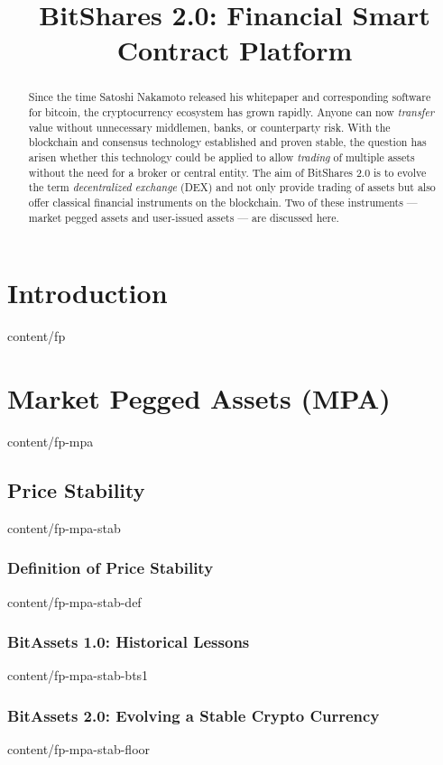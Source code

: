 \documentclass{btswhitepaper}
\title{BitShares 2.0: Financial Smart Contract Platform}
\begin{document}
\sloppy
\maketitle

\begin{abstract}%
 Since the time Satoshi Nakamoto released his whitepaper and corresponding
 software for bitcoin, the cryptocurrency ecosystem has grown rapidly. Anyone
 can now \emph{transfer} value without unnecessary middlemen, banks, or
 counterparty risk. With the blockchain and consensus technology established
 and proven stable, the question has arisen whether this technology could be
 applied to allow \emph{trading} of multiple assets without the need for a
 broker or central entity. The aim of BitShares 2.0 is to evolve the term
 \emph{decentralized exchange} (DEX) and not only provide trading of assets but
 also offer classical financial instruments on the blockchain. Two of these
 instruments --- market pegged assets and user-issued assets --- are discussed
 here.

\end{abstract}

\section        { Introduction                                     }  { content/fp                     } 

\section        { Market Pegged Assets (MPA)                       }  { content/fp-mpa                 } 
\subsection     { Price Stability                                  }  { content/fp-mpa-stab            } 
\subsubsection  { Definition of Price Stability                    }  { content/fp-mpa-stab-def        } 
\subsubsection  { BitAssets 1.0: Historical Lessons                }  { content/fp-mpa-stab-bts1       } 
\subsubsection  { BitAssets 2.0: Evolving a Stable Crypto Currency }  { content/fp-mpa-stab-floor      } 
\end{document}
